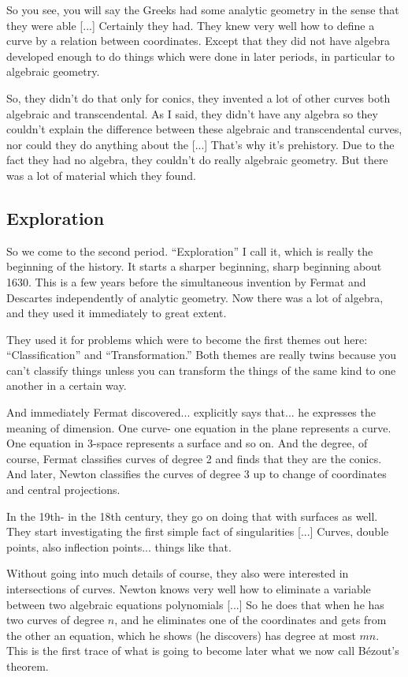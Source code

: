 \documentclass{article}
\begin{document}
So you see, you will say 
the Greeks had some analytic geometry
in the sense that they were able [...]
Certainly they had.
They knew very well how to define a curve 
by a relation between coordinates. 
Except that they did not have algebra 
developed enough to do things 
which were done in later periods, 
in particular to algebraic geometry.

So, they didn't do that only for conics,
they invented a lot of other curves 
both algebraic and transcendental.
As I said, they didn't have any algebra 
so they couldn't explain the difference between these
algebraic and transcendental curves,
nor could they do anything about the [...]
That's why it's prehistory.
Due to the fact they had no algebra, 
they couldn't do really algebraic geometry.
But there was a lot of material which they found.

\subsection{Exploration}
So we come to the second period. 
``Exploration'' I call it,
which is really the beginning of the history.
It starts a sharper beginning, sharp beginning about 1630. 
This is a few years before the simultaneous invention 
by Fermat and Descartes independently of analytic geometry.
Now there was a lot of algebra, 
and they used it immediately to great extent.

They used it for problems which were to become 
the first themes out here:
``Classification'' and ``Transformation.'' 
Both themes are really twins 
because you can't classify things 
unless you can transform the things 
of the same kind to one another in a certain way.

And immediately Fermat discovered... 
explicitly says that... 
he expresses the meaning of dimension.
One curve- one equation in the plane represents a curve.
One equation in 3-space represents a surface and so on.
And the degree, of course, 
Fermat classifies curves of degree 2 
and finds that they are the conics.
And later, Newton classifies the curves of degree 3 
up to change of coordinates and central projections.

In the 19th- in the 18th century, 
they go on doing that with surfaces as well.
They start investigating the first simple fact of singularities [...]  
Curves, double points, also inflection points... things like that.

Without going into much details of course,
they also were interested in intersections of curves.
Newton knows very well 
how to eliminate a variable 
between two algebraic equations polynomials [...]
So he does that when he has two curves of degree $n$, 
and he eliminates one of the coordinates 
and gets from the other an equation, 
which he shows (he discovers) has degree at most $mn$.
This is the first trace 
of what is going to become later 
what we now call B\'ezout's theorem.
\end{document}
